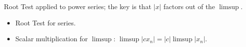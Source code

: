 \begin{remark*}
Root Test applied to power series; the key is that $|x|$ factors out of the $\limsup$.
\end{remark*}

\begin{remark*}[Dependencies]
\begin{itemize}
  \item Root Test for series.
  \item Scalar multiplication for $\limsup$: $\limsup |cx_n| = |c| \limsup |x_n|$.
\end{itemize}
\end{remark*}
